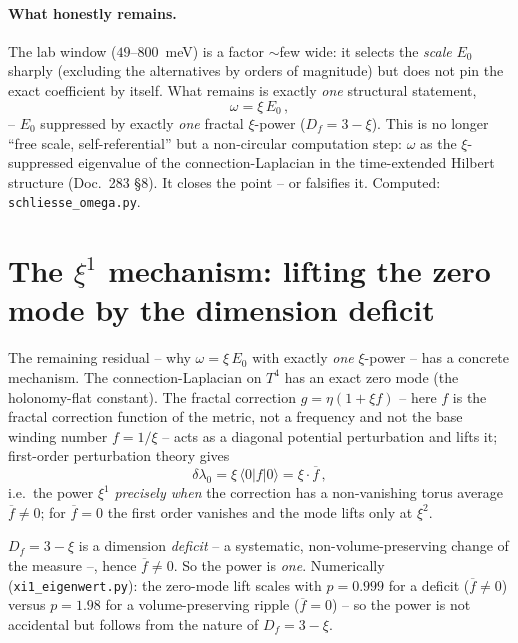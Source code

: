 \paragraph{What honestly remains.} The lab window ($49$--$800$~meV) is a factor $\sim$few wide: it
selects the \emph{scale} $E_0$ sharply (excluding the alternatives by orders of magnitude) but does not
pin the exact coefficient by itself. What remains is exactly \emph{one} structural statement,
\begin{equation}
\omega=\xi\,E_0\,,
\end{equation}
-- $E_0$ suppressed by exactly \emph{one} fractal $\xi$-power ($D_f=3-\xi$). This is no longer
\enquote{free scale, self-referential} but a non-circular computation step: $\omega$ as the
$\xi$-suppressed eigenvalue of the connection-Laplacian in the time-extended Hilbert structure
(Doc.~283 §8). It closes the point -- or falsifies it. Computed: \texttt{schliesse\_omega.py}.

\section{The $\xi^1$ mechanism: lifting the zero mode by the dimension deficit}
The remaining residual -- why $\omega=\xi\,E_0$ with exactly \emph{one} $\xi$-power -- has a concrete
mechanism. The connection-Laplacian on $T^4$ has an exact zero mode (the holonomy-flat constant). The
fractal correction $g=\eta(1+\xi f)$ -- here $f$ is the fractal correction function of the metric, not a
frequency and not the base winding number $f=1/\xi$ -- acts as a diagonal potential perturbation and lifts it;
first-order perturbation theory gives
\begin{equation}
\delta\lambda_0 = \xi\,\langle 0|f|0\rangle = \xi\cdot\overline f\,,
\end{equation}
i.e.\ the power $\xi^1$ \emph{precisely when} the correction has a non-vanishing torus average
$\overline f\neq0$; for $\overline f=0$ the first order vanishes and the mode lifts only at $\xi^2$.

$D_f=3-\xi$ is a dimension \emph{deficit} -- a systematic, non-volume-preserving change of the measure
--, hence $\overline f\neq0$. So the power is \emph{one}. Numerically (\texttt{xi1\_eigenwert.py}): the
zero-mode lift scales with $p=0.999$ for a deficit ($\overline f\neq0$) versus $p=1.98$ for a
volume-preserving ripple ($\overline f=0$) -- so the power is not accidental but follows from the
nature of $D_f=3-\xi$.

